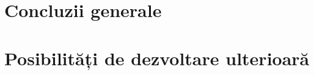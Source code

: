 \label{cap6}


\label{Chapter6} %

\thispagestyle{fancy}


\section{Concluzii generale} 

\section{Posibilități de dezvoltare ulterioară} 
